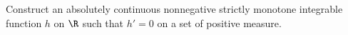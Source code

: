 Construct an absolutely continuous nonnegative strictly monotone
integrable function $h$ on $\R$ such that $h'=0$ on a set of positive
measure.
